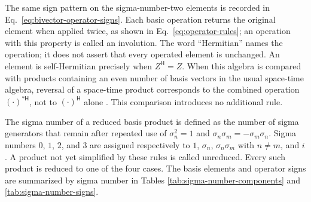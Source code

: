 \documentclass[10pt,letterpaper]{article}
\newcommand{\pv}[1]{#1}
\newcommand{\Hop}{\mathsf H}
\begin{document}
The same sign pattern on the sigma-number-two elements is recorded in
Eq.\ \eqref{eq:bivector-operator-signs}. Each basic operation returns the
original element when applied twice, as shown in Eq.\ \eqref{eq:operator-rules};
an operation with this property is called an involution. The word
``Hermitian'' names the operation; it does not assert that every operated
element is unchanged. An element is self-Hermitian precisely when
\(\pv{Z}^{\Hop}=\pv{Z}\). When this algebra is compared
with products containing an even number of basis vectors in the usual
space-time algebra, reversal of a
space-time product corresponds to the combined operation
\((\cdot)^{*\Hop}\), not to \((\cdot)^{\Hop}\) alone
\cite{hestenes1966,doran2003}. This comparison introduces no additional rule.

The sigma number of a reduced basis product is defined as the number of sigma
generators that remain after repeated use of
\(\pv{\sigma}_n^2=1\) and
\(\pv{\sigma}_n\pv{\sigma}_m=-\pv{\sigma}_m\pv{\sigma}_n\).
Sigma numbers \(0\), \(1\), \(2\), and \(3\) are assigned respectively to
\(1\), \(\pv{\sigma}_n\),
\(\pv{\sigma}_n\pv{\sigma}_m\) with \(n\neq m\), and \(i\). A product not
yet simplified by these rules is called unreduced. Every such product is
reduced to one of the four cases. The basis elements and operator signs are
summarized by sigma number in Tables \ref{tab:sigma-number-components} and
\ref{tab:sigma-number-signs}.

\end{document}

